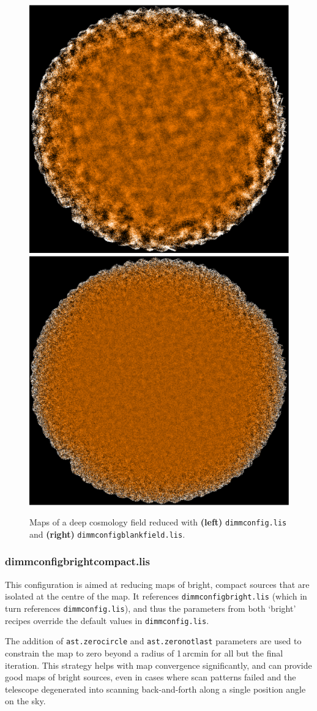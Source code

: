 \documentclass[twoside,11pt]{article}
\renewcommand{\_}{\texttt{\symbol{95}}}
\begin{document}
\begin{figure}[b!]
\begin{center}
\includegraphics[width=0.47\linewidth]{cosmo1-def}
\hspace{0.3cm}
\includegraphics[width=0.47\linewidth]{cosmo1-mf} 
\caption{\small Maps of a deep cosmology field reduced with  \textbf{(left)} \texttt{dimmconfig.lis} and \textbf{(right)} \texttt{dimmconfig\_blank\_field.lis}.}
\label{fig:bfcompare}
\end{center}
\end{figure}

\subsubsection{dimmconfig\_bright\_compact.lis}
This  configuration is aimed at reducing maps of bright, compact sources  that are isolated at the centre of the map. It references  \texttt{dimmconfig\_bright.lis} (which in turn references \texttt{dimmconfig.lis}),  and thus the parameters from both `bright' recipes override the default values in \texttt{dimmconfig.lis}. 

The addition of  \texttt{ast.zero\_circle} and \texttt{ast.zero\_notlast} parameters  are used to constrain the map to zero beyond a radius of 1\,arcmin  for all but the final iteration. This strategy helps with map  convergence significantly, and can provide good maps of bright  sources, even in cases where scan patterns failed and the telescope  degenerated into scanning back-and-forth along a single position  angle on the sky. 
\end{document}
